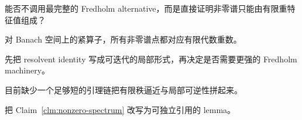 \documentclass[a4paper,12pt,oneside]{maki-notes}
\begin{document}
\begin{question}[更短证明链]
能否不调用最完整的 Fredholm alternative，而是直接证明非零谱只能由有限重特征值组成？
\end{question}

\begin{conjecture}[谱点有限重]
对 Banach 空间上的紧算子，所有非零谱点都对应有限代数重数。
\end{conjecture}

\begin{idea}
先把 resolvent identity 写成可迭代的局部形式，再决定是否需要更强的 Fredholm machinery。
\end{idea}

\begin{obstacle}
目前缺少一个足够短的引理链把有限秩逼近与局部可逆性拼起来。
\end{obstacle}

\begin{nextstep}
把 Claim~\ref{clm:nonzero-spectrum} 改写为可独立引用的 lemma。
\end{nextstep}

\PrintSymbolIndex
\PrintOpenProblemIndex
\end{document}
